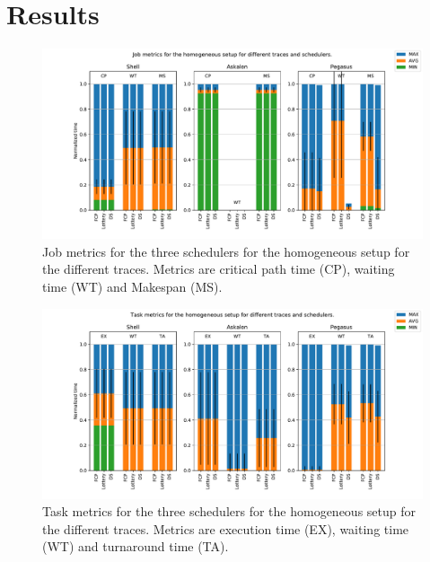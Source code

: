 \documentclass{article}
\begin{document}
\section{Results}

\begin{figure}[H]
    \centering
    \includegraphics[width=.8\textwidth]{setup_job.pdf}
    
    \caption{Job metrics for the three schedulers for the homogeneous setup for the different traces. Metrics are critical path time (CP), waiting time (WT) and Makespan (MS).}
    \label{fig:setup_job}
\end{figure}

\begin{figure}[H]
    \centering
    \includegraphics[width=.8\textwidth]{setup_task.pdf}
    \caption{Task metrics for the three schedulers for the homogeneous setup for the different traces. Metrics are execution time (EX), waiting time (WT) and turnaround time (TA).}
    \label{fig:setup_task}
\end{figure}
\end{document}
